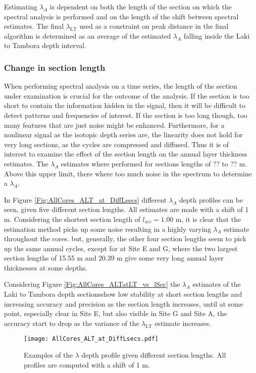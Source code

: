 \documentclass[../../CompleteThesis2/Complete_2ndDraft]{subfiles}
\begin{document}
Estimating $\lambda_A$ is dependent on both the length of the section on which the spectral analysis is performed and on the length of the shift between spectral estimates. The final $\lambda_{\text{LT}}$ used as a constraint on peak distance in the final algorithm is determined as an average of the estimated $\lambda_A$ falling inside the Laki to Tambora depth interval.

\subsubsection[Change in $l_{sec}$]{Change in section length}
\label{Subsubsec:SignalAnalysis_SpectralAnalysis_ALT_lsec}

When performing spectral analysis on a time series, the length of the section under examination is crucial for the outcome of the analysis. If the section is too short to contain the information hidden in the signal, then it will be difficult to detect patterns and frequencies of interest. If the section is too long though, too many features that are just noise might be enhanced. Furthermore, for a nonlinear signal as the isotopic depth series are, the linearity does not hold for very long sections, as the cycles are compressed and diffused. Thus it is of interest to examine the effect of the section length on the annual layer thickness estimates. The $\lambda_A$ estimates where performed for sections lengths of ?? to ?? m. Above this upper limit, there where too much noise in the spectrum to determine a $\lambda_A$.

In Figure \ref{Fig:AllCores_ALT_at_DiffLsecs} different $\lambda_A$ depth profiles can be seen, given five different section lengths. All estimates are made with a shift of 1 m. Considering the shortest section length of $l_{sec}=1.00$ m, it is clear that the estimation method picks up some noise resulting in a highly varying $\lambda_A$ estimate throughout the cores. but, generally, the other four section lengths seem to pick up the same annual cycles, except for at Site E and G, where the two largest section lengths of 15.55 m and 20.39 m give some very long annual layer thicknesses at some depths.

Considering Figure \ref{Fig:AllCores_ALTatLT_vs_lSec} the $\lambda_A$ estimates  of the Laki to Tambora depth sectionsshow low stability at short section lengths and increasing accuracy and precision as the section length increases, until at some point, especially clear in Site E, but also visible in Site G and Site A, the accuracy start to drop as the variance of the $\lambda_{\text{LT}}$ estimate increases.
\begin{figure}[h]
	\centering
	\texttt{[image: AllCores\_ALT\_at\_DiffLsecs.pdf]}
	\caption[$\lambda$ Depth Profiles, Different $l_{\text{sec}}$]{\small Examples of the $\lambda$ depth profile given different section lengths. All profiles are computed with a shift of 1 m.}
	\label{fig:AllCores_ALT_at_DiffLsecs}
\end{figure}
\end{document}
